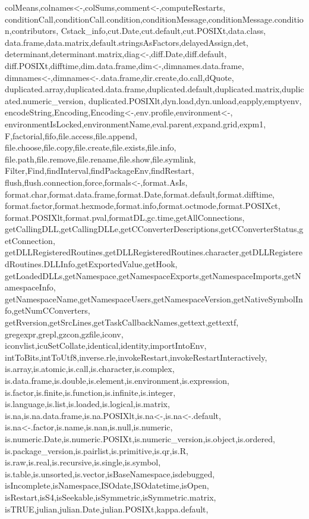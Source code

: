 {{colMeans,colnames<-,colSums,comment<-,computeRestarts,%
conditionCall,conditionCall.condition,conditionMessage,conditionMessage.condition,contributors,%
Cstack_info,cut.Date,cut.default,cut.POSIXt,data.class,%
data.frame,data.matrix,default.stringsAsFactors,delayedAssign,det,%
determinant,determinant.matrix,diag<-,diff.Date,diff.default,%
diff.POSIXt,difftime,dim.data.frame,dim<-,dimnames.data.frame,%
dimnames<-,dimnames<-.data.frame,dir.create,do.call,dQuote,%
duplicated.array,duplicated.data.frame,duplicated.default,duplicated.matrix,duplicated.numeric_version,%
duplicated.POSIXlt,dyn.load,dyn.unload,eapply,emptyenv,%
encodeString,Encoding,Encoding<-,env.profile,environment<-,%
environmentIsLocked,environmentName,eval.parent,expand.grid,expm1,%
F,factorial,fifo,file.access,file.append,%
file.choose,file.copy,file.create,file.exists,file.info,%
file.path,file.remove,file.rename,file.show,file.symlink,%
Filter,Find,findInterval,findPackageEnv,findRestart,%
flush,flush.connection,force,formals<-,format.AsIs,%
format.char,format.data.frame,format.Date,format.default,format.difftime,%
format.factor,format.hexmode,format.info,format.octmode,format.POSIXct,%
format.POSIXlt,format.pval,formatDL,gc.time,getAllConnections,%
getCallingDLL,getCallingDLLe,getCConverterDescriptions,getCConverterStatus,getConnection,%
getDLLRegisteredRoutines,getDLLRegisteredRoutines.character,getDLLRegisteredRoutines.DLLInfo,getExportedValue,getHook,%
getLoadedDLLs,getNamespace,getNamespaceExports,getNamespaceImports,getNamespaceInfo,%
getNamespaceName,getNamespaceUsers,getNamespaceVersion,getNativeSymbolInfo,getNumCConverters,%
getRversion,getSrcLines,getTaskCallbackNames,gettext,gettextf,%
gregexpr,grepl,gzcon,gzfile,iconv,%
iconvlist,icuSetCollate,identical,identity,importIntoEnv,%
intToBits,intToUtf8,inverse.rle,invokeRestart,invokeRestartInteractively,%
is.array,is.atomic,is.call,is.character,is.complex,%
is.data.frame,is.double,is.element,is.environment,is.expression,%
is.factor,is.finite,is.function,is.infinite,is.integer,%
is.language,is.list,is.loaded,is.logical,is.matrix,%
is.na,is.na.data.frame,is.na.POSIXlt,is.na<-,is.na<-.default,%
is.na<-.factor,is.name,is.nan,is.null,is.numeric,%
is.numeric.Date,is.numeric.POSIXt,is.numeric_version,is.object,is.ordered,%
is.package_version,is.pairlist,is.primitive,is.qr,is.R,%
is.raw,is.real,is.recursive,is.single,is.symbol,%
is.table,is.unsorted,is.vector,isBaseNamespace,isdebugged,%
isIncomplete,isNamespace,ISOdate,ISOdatetime,isOpen,%
isRestart,isS4,isSeekable,isSymmetric,isSymmetric.matrix,%
isTRUE,julian,julian.Date,julian.POSIXt,kappa.default,%
}}

